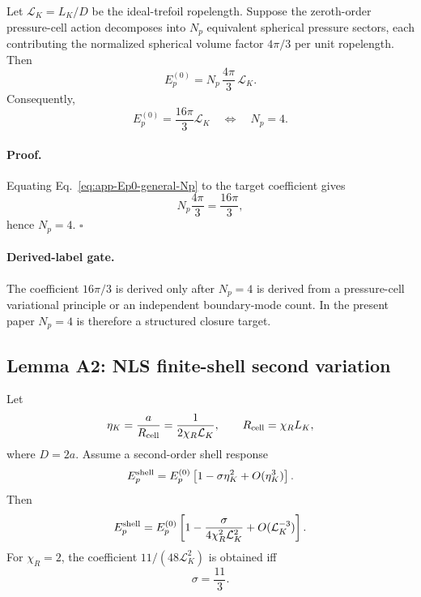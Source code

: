 \documentclass[11pt]{article}
\begin{document}
Let \(\mathcal L_K=L_K/D\) be the ideal-trefoil ropelength.  Suppose the
zeroth-order pressure-cell action decomposes into \(N_p\) equivalent spherical
pressure sectors, each contributing the normalized spherical volume factor
\(4\pi/3\) per unit ropelength.  Then
\begin{equation}
  E_p^{(0)}
  =
  N_p\,\frac{4\pi}{3}\,\mathcal L_K .
  \label{eq:app-Ep0-general-Np}
\end{equation}
Consequently,
\begin{equation}
  E_p^{(0)}
  =
  \frac{16\pi}{3}\mathcal L_K
  \quad\Longleftrightarrow\quad
  N_p=4.
  \label{eq:app-Ep0-Np4}
\end{equation}

\paragraph{Proof.}
Equating Eq.~\eqref{eq:app-Ep0-general-Np} to the target coefficient gives
\[
  N_p\frac{4\pi}{3}=\frac{16\pi}{3},
\]
hence \(N_p=4\). \(\square\)

\paragraph{Derived-label gate.}
The coefficient \(16\pi/3\) is derived only after \(N_p=4\) is derived from a
pressure-cell variational principle or an independent boundary-mode count.  In
the present paper \(N_p=4\) is therefore a structured closure target.

\subsection{Lemma A2: NLS finite-shell second variation}

Let
\begin{equation}
  \eta_K
  =
  \frac{a}{R_{\rm cell}}
  =
  \frac{1}{2\chi_R\mathcal L_K},
  \qquad
  R_{\rm cell}=\chi_R L_K,
  \label{eq:app-eta-chi-general}
\end{equation}
where \(D=2a\).  Assume a second-order shell response
\begin{equation}
  E_p^{\rm shell}
  =
  E_p^{(0)}
  \left[
  1-\sigma\eta_K^2+O(\eta_K^3)
  \right].
  \label{eq:app-Ep-shell-general}
\end{equation}
Then
\begin{equation}
  E_p^{\rm shell}
  =
  E_p^{(0)}
  \left[
  1-\frac{\sigma}{4\chi_R^2\mathcal L_K^2}
  +O(\mathcal L_K^{-3})
  \right].
  \label{eq:app-Ep-shell-c2}
\end{equation}
For \(\chi_R=2\), the coefficient \(11/(48\mathcal L_K^2)\) is obtained iff
\begin{equation}
  \sigma=\frac{11}{3}.
  \label{eq:app-sigma-required}
\end{equation}
\end{document}
